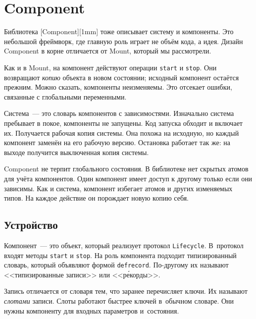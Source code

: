 \section{Component}


Библиотека [Component][1mm] тоже
описывает систему и компоненты. Это небольшой фреймворк, где главную роль играет
не объём кода, а идея. Дизайн Component в корне отличается от Mount, который мы
рассмотрели.


Как и в Mount, на компонент действуют операции \verb|start| и
\verb|stop|. Они возвращают \emph{копию} объекта в новом состоянии; исходный
компонент остаётся прежним. Можно сказать, компоненты неизменяемы. Это отсекает
ошибки, связанные с глобальными переменными.

Система~--- это словарь компонентов с зависимостями. Изначально система пребывает в
покое, компоненты не запущены. Код запуска обходит и включает их. Получается
рабочая копия системы. Она похожа на исходную, но каждый компонент заменён на
его рабочую версию. Остановка работает так же: на выходе получится выключенная
копия системы.

Component не терпит глобального состояния. В библиотеке нет скрытых атомов для
учёта компонентов. Один компонент имеет доступ к другому только если они
зависимы. Как и система, компонент избегает атомов и других изменяемых типов. На
каждое действие он порождает новую копию себя.

\subsection{Устройство}

\label{defrecord}

Компонент~--- это объект, который реализует протокол \verb|Lifecycle|. В~протокол
входят методы \verb|start| и \verb|stop|. На роль компонента подходит
типизированный словарь, который объявляют формой \verb|defrecord|. По-другому их
называют <<типизированные записи>> или <<р\'{е}корды>>.


Запись отличается от словаря тем, что заранее перечисляет ключи. Их называют
\emph{слотами} записи. Слоты работают быстрее ключей в~обычном словаре. Они
нужны компоненту для входных параметров и~состояния.

